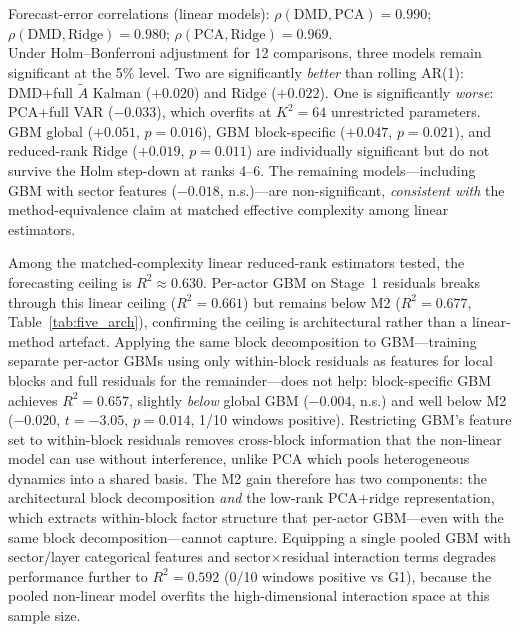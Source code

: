 \documentclass[11pt,a4paper]{article}
\begin{document}
\begin{table}[H]
\vspace{0.3em}
{\footnotesize Forecast-error correlations (linear models): $\rho(\text{DMD}, \text{PCA}) = 0.990$; $\rho(\text{DMD}, \text{Ridge}) = 0.980$; $\rho(\text{PCA}, \text{Ridge}) = 0.969$.\\
Under Holm--Bonferroni adjustment for 12 comparisons, three models remain significant at the 5\% level. Two are significantly \emph{better} than rolling AR(1): DMD+full $\tilde{A}$ Kalman ($+0.020$) and Ridge ($+0.022$). One is significantly \emph{worse}: PCA+full VAR ($-0.033$), which overfits at $K^2 = 64$ unrestricted parameters. GBM global ($+0.051$, $p = 0.016$), GBM block-specific ($+0.047$, $p = 0.021$), and reduced-rank Ridge ($+0.019$, $p = 0.011$) are individually significant but do not survive the Holm step-down at ranks 4--6. The remaining models---including GBM with sector features ($-0.018$, n.s.)---are non-significant, \emph{consistent with} the method-equivalence claim at matched effective complexity among linear estimators.}
\end{table}

Among the matched-complexity linear reduced-rank estimators tested, the forecasting ceiling is $R^2 \approx 0.630$. Per-actor GBM on Stage~1 residuals breaks through this linear ceiling ($R^2 = 0.661$) but remains below M2 ($R^2 = 0.677$, Table~\ref{tab:five_arch}), confirming the ceiling is architectural rather than a linear-method artefact. Applying the same block decomposition to GBM---training separate per-actor GBMs using only within-block residuals as features for local blocks and full residuals for the remainder---does not help: block-specific GBM achieves $R^2 = 0.657$, slightly \emph{below} global GBM ($-0.004$, n.s.) and well below M2 ($-0.020$, $t = -3.05$, $p = 0.014$, 1/10 windows positive). Restricting GBM's feature set to within-block residuals removes cross-block information that the non-linear model can use without interference, unlike PCA which pools heterogeneous dynamics into a shared basis. The M2 gain therefore has two components: the architectural block decomposition \emph{and} the low-rank PCA+ridge representation, which extracts within-block factor structure that per-actor GBM---even with the same block decomposition---cannot capture. Equipping a single pooled GBM with sector/layer categorical features and sector$\times$residual interaction terms degrades performance further to $R^2 = 0.592$ (0/10 windows positive vs G1), because the pooled non-linear model overfits the high-dimensional interaction space at this sample size.
\end{document}
